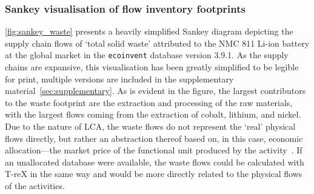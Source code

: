 \documentclass[a4paper,fleqn]{cas-dc}
\renewcommand{\texttt}[1]{{\ttfamily\small\nolinkurl{#1}}}
\begin{document}
\subsubsection{Sankey visualisation of flow inventory footprints}\label{sec:results-case_study-sankey}

\autoref{fig:sankey_waste} presents a heavily simplified Sankey diagram depicting the supply chain flows of `total solid waste' attributed to the NMC 811 Li-ion battery at the global market in the \texttt{ecoinvent} database version 3.9.1. As the supply chains are expansive, this visualisation has been greatly simplified to be legible for print, multiple versions are included in the supplementary material~\autoref{sec:supplementary}. As is evident in the figure, the largest contributors to the waste footprint are the extraction and processing of the raw materials, with the largest flows coming from the extraction of cobalt, lithium, and nickel. Due to the nature of LCA, the waste flows do not represent the `real' physical flows directly, but rather an abstraction thereof based on, in this case, economic allocation---the market price of the functional unit produced by the activity~\citep{guinee2004economicallocation}. If an unallocated database were available, the waste flows could be calculated with T-reX in the same way and would be more directly related to the physical flows of the activities.
\end{document}

